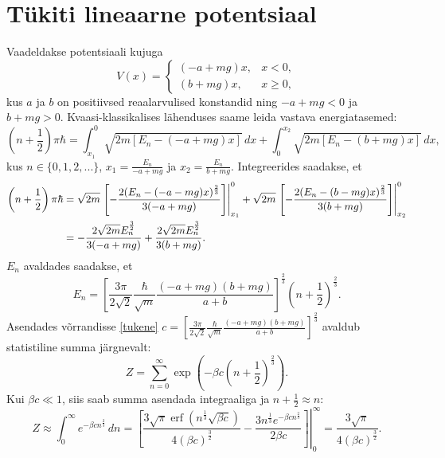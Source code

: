 \documentclass{trkut}%
\DeclareMathOperator{\erf}{erf}
\begin{document}
\section{Tükiti lineaarne potentsiaal}
Vaadeldakse potentsiaali kujuga
\begin{equation} \label{linpot}
    V(x)=\begin{cases}
        (-a+mg)x, & x<0,\\
        (b+mg)x, & x\ge0,
    \end{cases}
\end{equation}
kus $a$ ja $b$ on positiivsed reaalarvulised konstandid ning $-a+mg<0$ ja $b+mg>0$.
Kvaasi-klassikalises lähenduses saame leida vastava energiatasemed:
\begin{equation}
    \left( n+\frac{1}{2}\right)\pi \hbar = \int_{x_1}^{0} \sqrt{2m[E_n-(-a+mg)x]}\, dx + \int_{0}^{x_2} \sqrt{2m[E_n-(b+mg)x]} \, dx,
\end{equation}
kus \(n \in \{0, 1, 2, ...\}\), \(x_1=\frac{E_n}{-a+mg}\) ja \(x_2=\frac{E_n}{b+mg}\). Integreerides saadakse, et
\begin{align}
    \left(n+\frac{1}{2}\right)\pi \hbar &= \sqrt{2m}\left.\left[-\frac{2(E_n-(-a-mg)x)^\frac{2}{3}}{3(-a+mg)}\right]\right|^0_{x_1} + \sqrt{2m}\left.\left[-\frac{2(E_n-(b-mg)x)^\frac{2}{3}}{3(b+mg)}\right]\right|^{0}_{x_2} \notag \\
    &= -\frac{2\sqrt{2m}E_n^{\frac{3}{2}}}{3(-a+mg)}+\frac{2\sqrt{2m}E_n^{\frac{3}{2}}}{3(b+mg)}.
\end{align}
$E_n$ avaldades saadakse, et
\begin{equation}
    E_n =\left[\frac{3\pi}{2\sqrt{2}} \frac{\hbar}{\sqrt{m}} \frac{(-a+mg)(b+mg)}{a+b}\right]^{\frac{2}{3}} \left(n+\frac{1}{2}\right)^{\frac{2}{3}} . \label{tukene}
\end{equation}
Asendades võrrandisse \eqref{tukene} $c=\left[\frac{3\pi}{2\sqrt{2}} \frac{\hbar}{\sqrt{m}} \frac{(-a+mg)(b+mg)}{a+b}\right]^{\frac{2}{3}}$ avaldub statistiline summa järgnevalt:
\begin{equation}
    Z=\sum_{n=0}^{\infty} \exp \left( -\beta c \left(n+\frac{1}{2}\right)^\frac{2}{3} \right).
    \label{linsum}
\end{equation}
Kui $\beta c\ll 1$, siis saab summa asendada integraaliga ja $n+\frac{1}{2}\approx n$:
\begin{equation}
    Z \approx \int_0^\infty e^{-\beta c n^\frac{2}{3}} \, dn = \left.\left[ \frac{3\sqrt{\pi}  \erf{\left( {n}^\frac{1}{3} \sqrt{\beta c}\right)} }{4 (\beta c)^\frac{3}{2}}-\frac{3n^\frac{1}{3} e^{-\beta cn^\frac{2}{3}}}{2 \beta c }\right]\right|^{\infty}_{0} =\frac{3\sqrt{\pi}}{4(\beta c)^\frac{3}{2}} .
    \label{linpart}
\end{equation}
\end{document}

